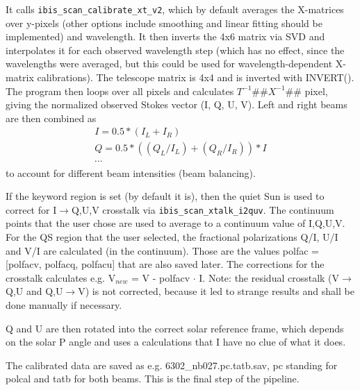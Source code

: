 \documentclass[a4paper,12pt]{article}
\begin{document}
\begin{minipage}{0.05\textwidth}\hfill
\end{minipage}
\begin{minipage}{0.95\textwidth}
It calls \texttt{ibis\_scan\_calibrate\_xt\_v2}, which by default averages the X-matrices over y-pixels (other options include smoothing and linear fitting should be implemented) and wavelength. It then inverts the 4x6 matrix via SVD and interpolates it for each observed wavelength step (which has no effect, since the wavelengths were averaged, but this could be used for wavelength-dependent X-matrix calibrations). The telescope matrix is 4x4 and is inverted with INVERT().
The program then loops over all pixels and calculates $T^{-1} \#\# X^{-1} \#\#$ pixel, giving the normalized observed Stokes vector (I, Q, U, V). Left and right beams are then combined as
\begin{eqnarray*}
I = 0.5 * (I_L + I_R) \\
Q = 0.5 * ((Q_L / I_L) + (Q_R/I_R)) * I \\
\cdots
\end{eqnarray*}
to account for different beam intensities (beam balancing).

If the keyword region is set (by default it is), then the quiet Sun is used to correct for I$\rightarrow$Q,U,V crosstalk via \texttt{ibis\_scan\_xtalk\_i2quv}. The continuum points that the user chose are used to average to a continuum value of I,Q,U,V. For the QS region that the user selected, the fractional polarizations Q/I, U/I and V/I are calculated (in the continuum). Those are the values polfac = [polfacv, polfacq, polfacu] that are also saved later. The corrections for the crosstalk calculates e.g. V$_{new}$ = V - polfacv $\cdot$ I. Note: the residual crosstalk (V$\rightarrow$Q,U and Q,U$\rightarrow$V) is not corrected, because it led to strange results and shall be done manually if necessary.

Q and U are then rotated into the correct solar reference frame, which depends on the solar P angle and uses a calculations that I have no clue of what it does.

The calibrated data are saved as e.g. 6302\_nb027.pc.tatb.sav, pc standing for polcal and tatb for both beams. This is the final step of the pipeline.

\end{minipage}
\end{document}

